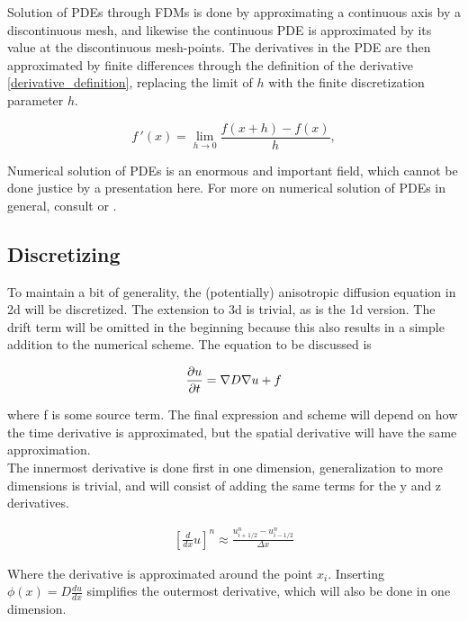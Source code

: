 Solution of PDEs through FDMs is done by approximating a continuous axis by a discontinuous mesh, and likewise the continuous PDE is approximated by its value at the discontinuous mesh-points. 
The derivatives in the PDE are then approximated by finite differences through the definition of the derivative \eqref{derivative_definition}, replacing the limit of $h$ with the  finite discretization parameter $h$.

\begin{equation}\label{derivative_definition}
 f\!\,'(x) = \lim_{h\to 0} \frac{f(x +h) - f(x)}{h},
\end{equation}

Numerical solution of PDEs is an enormous and important field, which cannot be done justice by a presentation here. 
For more on numerical solution of PDEs in general, consult \cite{} or \cite{}.

\subsection{Discretizing}\label{discretizing}

To maintain a bit of generality, the (potentially) anisotropic diffusion equation in 2d will be discretized. 
The extension to 3d is trivial, as is the 1d version. 
The drift term will be omitted in the beginning because this also results in a simple addition to the numerical scheme. The equation to be discussed is 

\begin{equation}
 \frac{\partial u}{\partial t} = \nabla D\nabla u +f
\end{equation}

where f is some source term. 
The final expression and scheme will depend on how the time derivative is approximated, but the spatial derivative will have the same approximation. \\
The innermost derivative is done first in one dimension, generalization to more dimensions is trivial, and will consist of adding the same terms for the y and z derivatives. 

\begin{align*}
 \left[\frac{d}{dx}u\right]^n \approx \frac{u^n_{i+1/2}-u^n_{i-1/2}}{\Delta x}
\end{align*}

Where the derivative is approximated around the point $x_i$. 
Inserting $\phi(x)=D\frac{du}{dx}$ simplifies the outermost derivative, which will also be done in one dimension.

